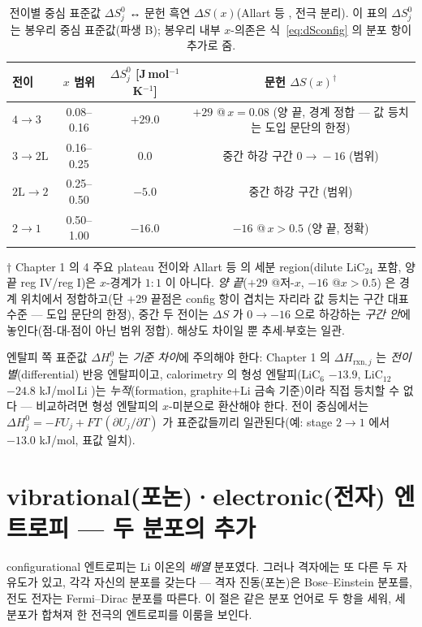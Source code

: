 \documentclass[11pt,a4paper]{article}
\newcommand{\rxn}{\mathrm{rxn}}
\begin{document}
\begin{table}[t]
\centering\small
\renewcommand{\arraystretch}{1.2}
\caption{전이별 중심 표준값 $\Delta S^0_j$ ↔ 문헌 흑연 $\Delta S(x)$(Allart 등 \cite{allart2018}, 전극 분리). 이 표의 $\Delta S^0_j$ 는 봉우리 중심 표준값(파생 B); 봉우리 내부 $x$-의존은 식~\eqref{eq:dSconfig} 의 분포 항이 추가로 줌.}
\label{tab:ds}
\begin{tabular}{l c c c}
\toprule
전이 & $x$ 범위 & $\Delta S^0_j$ [J\,mol$^{-1}$K$^{-1}$] & 문헌 $\Delta S(x)^\dagger$ \\
\midrule
$4\!\to\!3$ & 0.08–0.16 & $+29.0$ & $+29$ @\,$x{=}0.08$ (양 끝, 경계 정합 — 값 등치는 도입 문단의 한정) \\
$3\!\to\!2\mathrm L$ & 0.16–0.25 & $0.0$ & 중간 하강 구간 $0\!\to\!-16$ (범위) \\
$2\mathrm L\!\to\!2$ & 0.25–0.50 & $-5.0$ & 중간 하강 구간 (범위) \\
$2\!\to\!1$ & 0.50–1.00 & $-16.0$ & $-16$ @\,$x{>}0.5$ (양 끝, 정확) \\
\bottomrule
\end{tabular}

\smallskip
{\footnotesize $\dagger$ Chapter 1 의 4 주요 plateau 전이와 Allart 등 \cite{allart2018} 의 세분 region(dilute
LiC$_{24}$ 포함, 양 끝 reg IV/reg I)은 $x$-경계가 $1{:}1$ 이 아니다. \emph{양 끝}($+29$ @저-$x$, $-16$ @$x{>}0.5$)
은 경계 위치에서 정합하고(단 $+29$ 끝점은 config 항이 겹치는 자리라 값 등치는 구간 대표 수준 — 도입
문단의 한정), 중간 두 전이는 $\Delta S$ 가 $0\to-16$ 으로 하강하는 \emph{구간 안}에 놓인다(점-대-점이 아닌
범위 정합). 해상도 차이일 뿐 추세$\cdot$부호는 일관.}
\end{table}

엔탈피 쪽 표준값 $\Delta H^0_j$ 는 \emph{기준 차이}에 주의해야
한다: Chapter 1 의 $\Delta H_{\rxn,j}$ 는 \emph{전이별}(differential) 반응 엔탈피이고, calorimetry 의 형성
엔탈피(LiC$_6$ $-13.9$, LiC$_{12}$ $-24.8$ kJ/mol\,Li \cite{chemmater2015})는 \emph{누적}(formation,
graphite+Li 금속 기준)이라 직접 등치할 수 없다 — 비교하려면 형성 엔탈피의 $x$-미분으로 환산해야 한다. 전이
중심에서는 $\Delta H^0_j=-FU_j+FT\,(\partial U_j/\partial T)$ 가 표준값들끼리 일관된다(예: stage $2\to1$ 에서
$-13.0$ kJ/mol, 표값 일치).

\section{vibrational(포논)·electronic(전자) 엔트로피 — 두 분포의 추가}\label{sec:vibel}
configurational 엔트로피는 Li 이온의 \emph{배열} 분포였다. 그러나 격자에는 또 다른 두 자유도가 있고, 각각
자신의 분포를 갖는다 — 격자 진동(포논)은 Bose--Einstein 분포를, 전도 전자는 Fermi--Dirac 분포를 따른다.
이 절은 같은 분포 언어로 두 항을 세워, 세 분포가 합쳐져 한 전극의 엔트로피를 이룸을 보인다.
\end{document}
